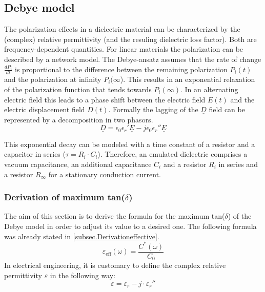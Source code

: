 \subsection{Debye model}
The polarization effects in a dielectric material can be characterized by the (complex) relative permittivity (and the resuling dielectric loss factor). Both are frequency-dependent quantities. 
For linear materials the polarization can be described by a network model. The Debye-ansatz assumes that the rate of change $ \frac{dP_i}{dt}$ is proportional to the difference between the remaining polarization $P_i(t)$  and the polarization at infinity $P_i(\infty$). This results in an exponential relaxation of the polarization function that tends towards $P_i(\infty)$. In an alternating electric field this leads to a phase shift between the electric field $E(t)$ and the 
electric displacement field $D(t)$.
\newline
Formally the lagging of the $\underline{D}$ field can be represented by a decomposition in two phasors.
\begin{equation}
 \underline{D}=\epsilon_{0}\epsilon_{r}'\underline{E}-j\epsilon_{0}\epsilon_{r}''\underline{E}
\end{equation}

This exponential decay can be modeled with a time constant of a resistor and a capacitor in series ($\tau=R_i \cdot C_i$). Therefore, an emulated dielectric comprises a vacuum capacitance, an additional capacitance $C_i$ and a resistor $R_i$ in series and a resistor $R_{\infty}$ for a stationary conduction current. 


\subsubsection{Derivation of maximum tan($\delta$)}
The aim of this section is to derive the formula for the maximum tan($\delta$) of the Debye model in order to adjust its value to a desired one. The following formula was already stated in \ref{subsec.Derivationeffective}.
\begin{equation}
\varepsilon_{\textrm{eff}} (\omega) = \frac{C^*(\omega)}{C_0}
\end{equation}
In electrical engineering, it is customary to define the  complex relative permittivity $\varepsilon$ in the following way: 
\begin{equation}
\varepsilon  = \varepsilon_r-j \cdot \varepsilon_r''
\end{equation}

